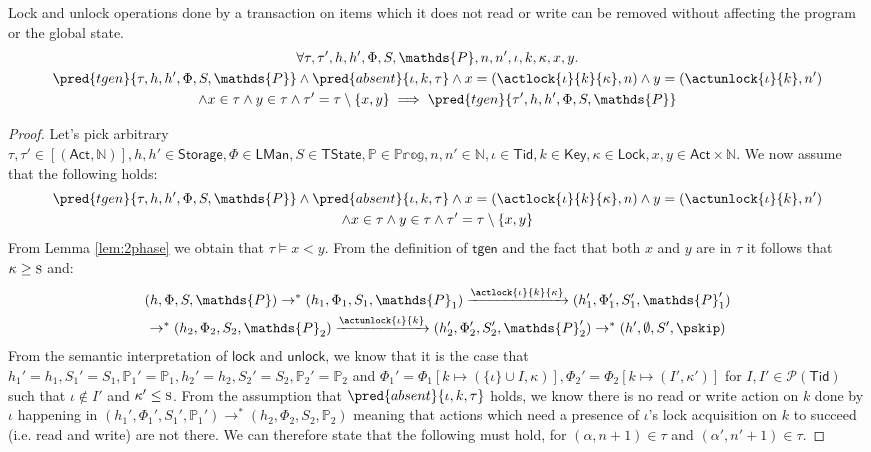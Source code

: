 \iffalse
\lem Lock and unlock operations done by a transaction on items which it does not read or write can be removed without affecting the program or the global state.
\begin{gather*}
	\forall \tau, \tau', h, h', \Phi, S, \mathds{P}, n, n', \iota, k, \kappa, x, y \ldotp
		\\
	\pred{tgen}{\tau, h, h', \Phi, S, \mathds{P}} \land  \pred{absent}{\iota, k, \tau} \land x = (\actlock{\iota}{k}{\kappa}, n) \land y = (\actunlock{\iota}{k}, n') \\ \land x \in \tau \land y \in \tau
	\land \tau' = \tau \setminus \{ x, y \}
		\implies
	\pred{tgen}{\tau', h, h', \Phi, S, \mathds{P}}
\end{gather*}
\begin{proof}
Let's pick arbitrary $\tau, \tau' \in [(\mathsf{Act}, \mathds{N})], h, h' \in \mathsf{Storage}, \Phi \in \mathsf{LMan}, S \in \mathsf{TState}, \mathds{P} \in \mathds{Prog}, n, n' \in \mathds{N}, \iota \in \mathsf{Tid}, k \in \mathsf{Key}, \kappa \in \mathsf{Lock}, x, y \in \mathsf{Act} \times \mathds{N}$. We now assume that the following holds:
\begin{gather*}
	\pred{tgen}{\tau, h, h', \Phi, S, \mathds{P}} \land  \pred{absent}{\iota, k, \tau} \land x = (\actlock{\iota}{k}{\kappa}, n) \land y = (\actunlock{\iota}{k}, n') \\ \land x \in \tau \land y \in \tau
	\land \tau' = \tau \setminus \{ x, y \}
\end{gather*}
From Lemma \ref{lem:2phase} we obtain that $\tau \vDash x < y$. From the definition of $\mathsf{tgen}$ and the fact that both $x$ and $y$ are in $\tau$ it follows that $\kappa \geq \textsc{s}$ and:
\begin{gather}
	(h, \Phi, S, \mathds{P}) \rightarrow^* (h_1, \Phi_1, S_1, \mathds{P}_1) \xrightarrow{\actlock{\iota}{k}{\kappa}} (h_1', \Phi_1', S_1', \mathds{P}_1') \\ \rightarrow^* (h_2, \Phi_2, S_2, \mathds{P}_2) \xrightarrow{\actunlock{\iota}{k}} (h_2', \Phi_2', S_2', \mathds{P}_2') \rightarrow^* (h', \emptyset, S', \pskip)
\end{gather}
From the semantic interpretation of $\mathsf{lock}$ and $\mathsf{unlock}$, we know that it is the case that $h_1' = h_1, S_1' = S_1, \mathds{P}_1' = \mathds{P}_1, h_2' = h_2, S_2' = S_2, \mathds{P}_2' = \mathds{P}_2$ and $\Phi_1' = \Phi_1[k \mapsto (\{\iota\} \cup I, \kappa)], \Phi_2' = \Phi_2[k \mapsto (I', \kappa')]$ for $I, I' \in \mathcal{P}(\mathsf{Tid})$ such that $\iota \not\in I'$ and $\kappa' \leq \textsc{s}$. From the assumption that $\pred{absent}{\iota, k, \tau}$ holds, we know there is no read or write action on $k$ done by $\iota$ happening in $(h_1', \Phi_1', S_1', \mathds{P}_1') \rightarrow^* (h_2, \Phi_2, S_2, \mathds{P}_2)$ meaning that actions which need a presence of $\iota$'s lock acquisition on $k$ to succeed (i.e. read and write) are not there. We can therefore state that the following must hold, for $(\alpha, n+1) \in \tau$ and $(\alpha', n'+1) \in \tau$.

\end{proof}
